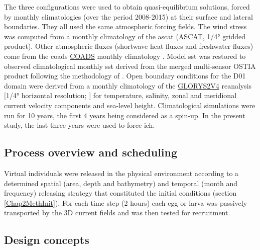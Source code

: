 The three configurations were used to obtain quasi-equilibrium solutions, forced by monthly climatologies (over the period 2008-2015) at their surface and lateral boundaries. They all used the same atmospheric forcing fields. The wind stress was computed from a monthly climatology of the \acrlong{ascat} (\href{https://www.ospo.noaa.gov/Products/atmosphere/ascat/}{ASCAT}, 1/4° gridded product). Other atmospheric fluxes (shortwave heat fluxes and freshwater fluxes) come from the \acrlong{coads} \href{https://repository.library.noaa.gov/view/noaa/49337}{COADS} monthly climatology \citep{DasiYoun1994}. Model \acrfull{sst} was restored to observed climatological monthly \acrshort{sst} derived from the merged multi-sensor OSTIA product \citep{DonlMart2012} following the methodology of \citep{BarnSief1995}. Open boundary conditions for the D01 domain were derived from a monthly climatology of the \href{https://www.mercator-ocean.eu/en/ocean-science/glorys/}{GLORYS2V4} reanalysis [1/4° horizontal resolution; \citep{FerrPare2012}] for temperature, salinity, zonal and meridional current velocity components and sea-level height. Climatological simulations were run for 10 years, the first 4 years being considered as a spin-up. In the present study, the last three years were used to force \gls{ich}.\\

\subsection{Process overview and scheduling}\label{Chap2MethProc}

Virtual individuals were released in the physical environment according to a determined spatial (area, depth and bathymetry) and temporal (month and frequency) releasing strategy that constituted the initial conditions (section \ref{Chap2MethInit}). For each time step (2 hours) each egg or larva was passively transported by the 3D current fields and was then tested for recruitment.\\

\subsection{Design concepts}\label{Chap2MethDesi}

